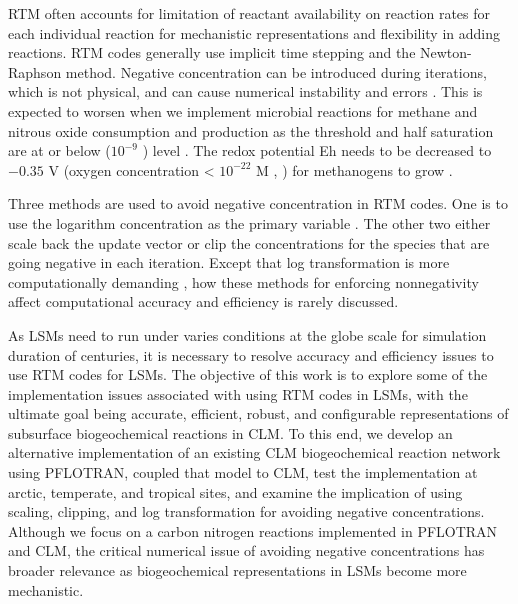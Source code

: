 \documentclass[gmd, manuscript]{copernicus}
\begin{document}
RTM often accounts for limitation of reactant availability on reaction rates
for each individual reaction for mechanistic representations and flexibility in
adding reactions. RTM codes generally use implicit time stepping and the
Newton-Raphson method. Negative concentration can be introduced during
iterations, which is not physical, and can cause numerical instability and
errors \citep{Shampine2005}. This is expected to worsen when we implement
microbial reactions for methane and nitrous oxide consumption and production as
the threshold and half saturation are at or below  ($10^{-9}$
) level \citep{Conrad1996}. The redox potential Eh needs to be
decreased to $-0.35$ \unit{V} (oxygen concentration < $10^{-22}$ \unit{M}
\citeauthor{Hungate1975}, \citeyear{Hungate1975}) for methanogens to grow
\citep{Jarrell1985}. 

Three methods are used to avoid negative concentration in RTM codes. One is to
use the logarithm concentration as the primary variable
\citep{Bethke2007,Hammond2003,Parkhurst1999}. The other two either scale back
the update vector \citep{Bethke2007,Hammond2003} or clip the concentrations for
the species that are going negative \citep{Yeh2004,White2005,Xu2014} in each
iteration. Except that log transformation is more computationally demanding
\citep{Hammond2003}, how these methods for enforcing nonnegativity affect
computational accuracy and efficiency is rarely discussed. 

As LSMs need to run under varies conditions at the globe scale for simulation
duration of centuries, it is necessary to resolve accuracy and efficiency
issues to use RTM codes for LSMs. The objective of this work is to explore some
of the implementation issues associated with using RTM codes in LSMs, with the
ultimate goal being accurate, efficient, robust, and configurable
representations of subsurface biogeochemical reactions in CLM. To this end, we
develop an alternative implementation of an existing CLM biogeochemical
reaction network using PFLOTRAN, coupled that model to CLM, test the
implementation at arctic, temperate, and tropical sites, and examine the
implication of using scaling, clipping, and log transformation for avoiding
negative concentrations.  Although we focus on a carbon nitrogen reactions
implemented in PFLOTRAN and CLM, the critical numerical issue of avoiding
negative concentrations has broader relevance as biogeochemical representations
in LSMs become more mechanistic. 
\end{document}
